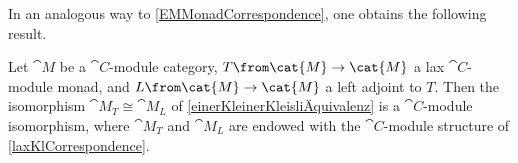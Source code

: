 In an analogous way to \cref{EMMonadCorrespondence},
one obtains the following result.

\begin{proposition}\label{KleisliMonadCorrespondence}
  Let \(\cat{M}\) be a \(\cat{C}\)\hyp{}module category,
  \(T\from \cat{M}\to \cat{M}\) a lax \(\cat{C}\)\hyp{}module monad,
  and \(L\from \cat{M} \to \cat{M}\) a left adjoint to \(T\).
  Then the isomorphism \(\cat{M}_T \cong \cat{M}_{L}\) of \cref{einerKleinerKleisliÄquivalenz}
  is a \(\cat{C}\)\hyp{}module isomorphism,
  where \(\cat{M}_T\) and \(\cat{M}_L\) are
  endowed with the \(\cat{C}\)\hyp{}module structure of \cref{laxKlCorrespondence}.
\end{proposition}

